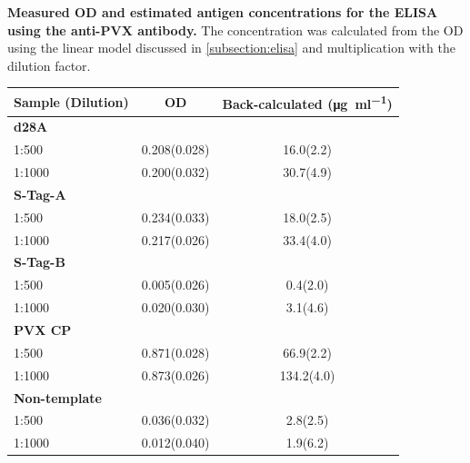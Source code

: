 \begin{supptable}[ht]
    \centering
    \caption{\textbf{Measured OD and estimated antigen concentrations for the ELISA using the anti-PVX antibody.} The concentration was calculated from the OD using the linear model discussed in \autoref{subsection:elisa} and multiplication with the dilution factor. }
    \label{tab:sample_values_elisa_anti_pvx}
    \begin{tabular}{
        l
        S[table-format=1.3(2),uncertainty-mode=separate]
        S[table-format=3.1(1),uncertainty-mode=separate]
    }
    \toprule
    {\textbf{Sample (Dilution)}} &
    {\textbf{OD}} &
    {\textbf{Back-calculated (\si{\micro\gram\per\milli\litre})}} \\
    \midrule
    \textbf{d28A} \\
    1:500 & 0.208(0.028) & 16.0(2.2) \\
    1:1000 & 0.200(0.032) & 30.7(4.9) \\
    \textbf{S-Tag-A} \\
    1:500 & 0.234(0.033) & 18.0(2.5) \\
    1:1000 & 0.217(0.026) & 33.4(4.0) \\
    \textbf{S-Tag-B} \\
    1:500 & 0.005(0.026) & 0.4(2.0) \\
    1:1000 & 0.020(0.030) & 3.1(4.6) \\
    \textbf{PVX CP} \\
    1:500 & 0.871(0.028) & 66.9(2.2) \\
    1:1000 & 0.873(0.026) & 134.2(4.0) \\
    \textbf{Non-template} \\
    1:500 & 0.036(0.032) & 2.8(2.5) \\
    1:1000 & 0.012(0.040) & 1.9(6.2) \\
    \bottomrule
    \end{tabular}
\end{supptable}

